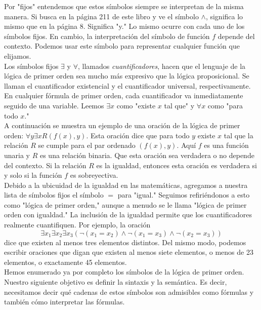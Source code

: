 \documentclass[12pt,a4paper]{book}
\newcommand{\comillas}[1]{"#1"}
\begin{document}
    Por \comillas{fijos} entendemos que estos símbolos siempre se interpretan de la misma manera. Si busca en la página 211
    de este libro y ve el símbolo $\wedge$, significa lo mismo que en la página 8. Significa \comillas{y.} Lo mismo ocurre
    con cada uno de los símbolos fijos. En cambio, la interpretación del símbolo de función $f$ depende del contexto. Podemos
    usar este símbolo para representar cualquier función que elijamos.\\
    Los símbolos fijos $\exists$ y $\forall$, llamados \textit{cuantificadores}, hacen que el lenguaje de la lógica de primer
    orden sea mucho más expresivo que la lógica proposicional. Se llaman el cuantificador existencial y el cuantificador
    universal, respectivamente. En cualquier fórmula de primer orden, cada cuantificador va inmediatamente seguido de una
    variable. Leemos $\exists x$ como \comillas{existe $x$ tal que} y $\forall x$ como \comillas{para todo $x$.}\\
    A continuación se muestra un ejemplo de una oración de la lógica de primer orden: $\forall y\exists xR(f(x),y)$. Esta
    oración dice que para todo $y$ existe $x$ tal que la relación $R$ se cumple para el par ordenado $(f(x),y)$. Aquí $f$
    es una función unaria y $R$ es una relación binaria. Que esta oración sea verdadera o no depende del contexto. Si la
    relación $R$ es la igualdad, entonces esta oración es verdadera si y solo si la función $f$ es sobreyectiva.\\
    Debido a la ubicuidad de la igualdad en las matemáticas, agregamos a nuestra lista de símbolos fijos el símbolo $=$ para
    \comillas{igual.} Seguimos refiriéndonos a esto como \comillas{lógica de primer orden,} aunque a menudo se le llama
    \comillas{lógica de primer orden con igualdad.} La inclusión de la igualdad permite que los cuantificadores realmente
    cuantifiquen. Por ejemplo, la oración
    \begin{equation*}
        \exists x_{1}\exists x_{2}\exists x_{3}(\neg(x_{1}=x_{2})\wedge\neg(x_{1}=x_{3})\wedge\neg(x_{2}=x_{3}))
    \end{equation*}
    dice que existen al menos tres elementos distintos. Del mismo modo, podemos escribir oraciones que digan que existen al
    menos siete elementos, o menos de 23 elementos, o exactamente 45 elementos.\\
    Hemos enumerado ya por completo los símbolos de la lógica de primer orden. Nuestro siguiente objetivo es definir la
    sintaxis y la semántica. Es decir, necesitamos decir qué cadenas de estos símbolos son admisibles como fórmulas y
    también cómo interpretar las fórmulas.
\end{document}
